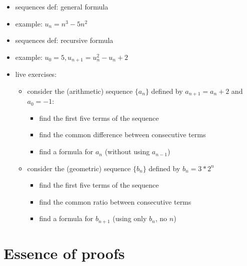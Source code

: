 \begin{itemize}
\tightlist
\item
  sequences def: general formula
\item
  example: \(u_n = n^3-5n^2\)
\item
  sequences def: recursive formula
\item
  example: \(u_0 = 5, u_{n+1} = u_n^2-u_n+2\)
\item
  live exercises:

  \begin{itemize}
  \tightlist
  \item
    consider the (arithmetic) sequence \(\{a_n\}\) defined by
    \(a_{n+1}=a_n+2\) and \(a_0=-1\):

    \begin{itemize}
    \tightlist
    \item
      find the first five terms of the sequence
    \item
      find the common difference between consecutive terms
    \item
      find a formula for \(a_n\) (without using \(a_{n-1}\))
    \end{itemize}
  \item
    consider the (geometric) sequence \(\{b_n\}\) defined by
    \(b_n=3*2^n\)

    \begin{itemize}
    \tightlist
    \item
      find the first five terms of the sequence
    \item
      find the common ratio between consecutive terms
    \item
      find a formula for \(b_{n+1}\) (using only \(b_n\), no \(n\))
    \end{itemize}
  \end{itemize}
\end{itemize}

\hypertarget{essence-of-proofs}{%
\section{Essence of proofs}\label{essence-of-proofs}}

